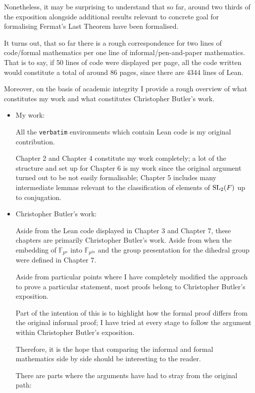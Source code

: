 Nonetheless, it may be surprising to understand that so far, around two thirds of the exposition alongside additional results relevant to concrete goal for formalising Fermat's Last Theorem have been formalised.

It turns out, that so far there is a rough correspondence for two lines of code/formal mathematics per one line of informal/pen-and-paper mathematics. That is to say, if 50 lines of code were displayed per page, all
the code written would constitute a total of around 86 pages, since there are 4344 lines of Lean.

Moreover, on the basis of academic integrity I provide a rough overview of what constitutes my work and what constitutes Christopher Butler's work.

\begin{itemize}
    \item My work:
    
    All the \texttt{verbatim} environments which contain Lean code is my original contribution.
    
    Chapter 2 and Chapter 4 constitute my work completely; a lot of the structure and set up for Chapter 6 is my work
    since the original argument turned out to be not easily formalisable; Chapter 5 includes many intermediate lemmas relevant
    to the classification of elements of $\operatorname{SL}_2(F)$ up to conjugation.


    \item Christopher Butler's work:
    
    Aside from the Lean code displayed in Chapter 3 and Chapter 7, these chapters are primarily Christopher Butler's work. Aside from
    when the embedding of $\mathbb{F}_{p^n}$ into $\mathbb{F}_{p^{2n}}$ and the group presentation for the dihedral group were defined 
    in Chapter 7.
    
    Aside from particular points where I have completely modified the approach to prove a particular statement, most proofs belong to Christopher Butler's exposition.
    
    Part of the intention of this is to highlight how the formal proof differs from the 
    original informal proof; I have tried at every stage to follow the argument within Christopher Butler's exposition. 
    
    Therefore, it is the hope that comparing the informal and formal mathematics side by side should be interesting to the reader.

    There are parts where the arguments have had to stray from the original path:
    

\end{itemize}
